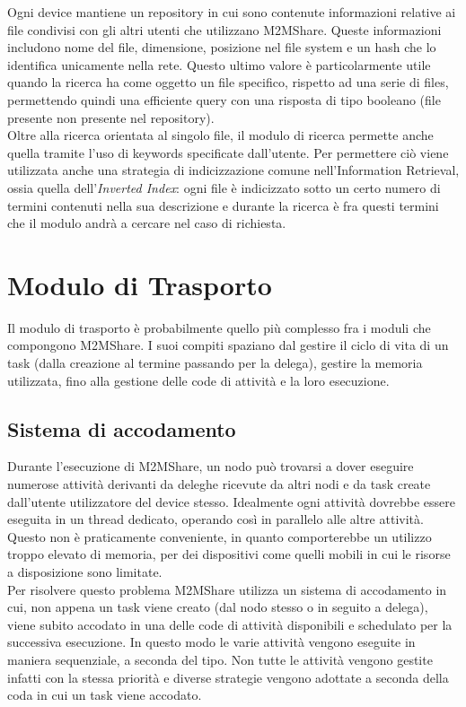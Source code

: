 Ogni device mantiene un repository in cui sono contenute informazioni relative ai file condivisi con gli altri utenti che utilizzano M2MShare. Queste informazioni includono nome del file, dimensione, posizione nel file system e un hash che lo identifica unicamente nella rete. Questo ultimo valore \`{e} particolarmente utile quando la ricerca ha come oggetto un file specifico, rispetto ad una serie di files, permettendo quindi una efficiente query con una risposta di tipo booleano (file presente \/ non presente nel repository).
\\
Oltre alla ricerca orientata al singolo file, il modulo di ricerca permette anche quella tramite l'uso di keywords specificate dall'utente. Per permettere ci\`{o} viene utilizzata anche una strategia di indicizzazione comune nell'Information Retrieval, ossia quella dell'\textit{Inverted Index}: ogni file \`{e} indicizzato sotto un certo numero di termini contenuti nella sua descrizione e durante la ricerca \`{e} fra questi termini che il modulo andrà a cercare nel caso di richiesta. 


\section{Modulo di Trasporto}
Il modulo di trasporto è probabilmente quello più complesso fra i moduli che compongono M2MShare. I suoi compiti spaziano dal gestire il ciclo di vita di un task (dalla creazione al termine passando per la delega), gestire la memoria utilizzata, fino alla gestione delle code di attività e la loro esecuzione.

\subsection{Sistema di accodamento}
Durante l'esecuzione di M2MShare, un nodo può trovarsi a dover eseguire numerose attività derivanti da deleghe ricevute da altri nodi e da task create dall'utente utilizzatore del device stesso. Idealmente ogni attività dovrebbe essere eseguita in un thread dedicato, operando così in parallelo alle altre attività. Questo non è praticamente conveniente, in quanto comporterebbe un utilizzo troppo elevato di memoria, per dei dispositivi come quelli mobili in cui le risorse a disposizione sono limitate. 
\\

Per risolvere questo problema M2MShare utilizza un sistema di accodamento in cui, non appena un task viene creato (dal nodo stesso o in seguito a delega), viene subito accodato in una delle code di attività disponibili e schedulato per la successiva esecuzione. In questo modo le varie attività vengono eseguite in maniera sequenziale, a seconda del tipo. Non tutte le attività vengono gestite infatti con la stessa priorità e diverse strategie vengono adottate a seconda della coda in cui un task viene accodato.
\\

